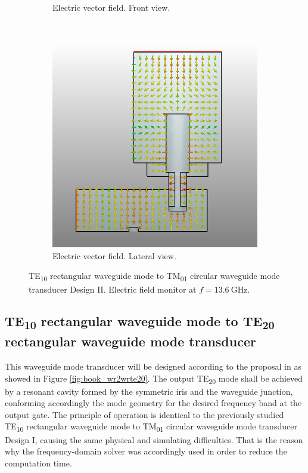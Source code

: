 \documentclass[english,twoside]{article}
\begin{document}
\begin{landscape}
\begin{figure}
\begin{subfigure}[b]{0.45\textwidth}
					\caption{Electric vector field. Front view.}
				\end{subfigure}
				\vspace{10pt}\newline
				~
				\begin{subfigure}[b]{.5\textwidth}
					\includegraphics[width=\textwidth]{figures/wrToWcTM01_lateral}
					\caption{Electric vector field. Lateral view.}
				\end{subfigure}
				\caption{TE\textsubscript{10} rectangular waveguide mode to TM\textsubscript{01} circular waveguide mode transducer Design II. Electric field monitor at $f=\SI{13.6}{\giga\hertz}$.}
				\label{fig:wrToWcTM01_field}
			\end{figure}
		\end{landscape}
		
	\newpage
	\subsection{TE\textsubscript{10} rectangular waveguide mode to TE\textsubscript{20} rectangular waveguide mode transducer}
    This waveguide mode transducer will be designed according to the proposal in \cite{montgomery} as showed in Figure \ref{fig:book_wr2wrte20}. The output \ac{TE}\textsubscript{20} mode shall be achieved by a resonant cavity formed by the symmetric iris and the waveguide junction, conforming accordingly the mode geometry for the desired frequency band at the output gate. The principle of operation is identical to the previously studied \ac{TE}\textsubscript{10} rectangular waveguide mode to \ac{TM}\textsubscript{01} circular waveguide mode transducer Design I, causing the same physical and simulating difficulties. That is the reason why the frequency-domain solver was accordingly used in order to reduce the computation time.
  
\end{document}
